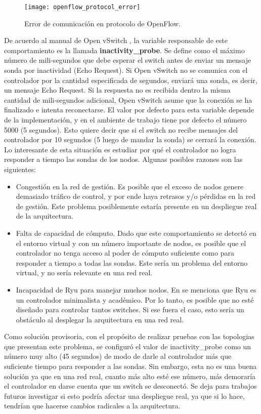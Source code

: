 \begin{figure}[t]
	\caption{Error de comunicación en protocolo de OpenFlow.}
	\texttt{[image: openflow\_protocol\_error]}
	\centering
	\label{fig:openflow_protocol_error}
\end{figure}
De acuerdo al manual de Open vSwitch \cite{ovs-vswitchd-conf}, la variable responsable de este comportamiento es la llamada \textbf{inactivity\_probe}. Se define como el máximo número de mili-segundos que debe esperar el switch antes de enviar un mensaje sonda por inactividad (Echo Request). Si Open vSwitch no se comunica con el controlador por la cantidad especificada de segundos, enviará una sonda, es decir, un mensaje Echo Request. Si la respuesta no es recibida dentro la misma cantidad de mili-segundos adicional, Open vSwitch asume que la conexión se ha finalizado e intenta reconectarse. El valor por defecto para esta variable depende de la implementación, y en el ambiente de trabajo tiene por defecto el número 5000 (5 segundos). Esto quiere decir que si el switch no recibe mensajes del controlador por 10 segundos (5 luego de mandar la sonda) se cerrará la conexión. \\
Lo interesante de esta situación es estudiar por qué el controlador no logra responder a tiempo las sondas de los nodos. Algunas posibles razones son las siguientes:
\begin{itemize}
	\item Congestión en la red de gestión. Es posible que el exceso de nodos genere demasiado tráfico de control, y por ende haya retrasos y/o pérdidas en la red de gestión. Este problema posiblemente estaría presente en un despliegue real de la arquitectura.
	\item Falta de capacidad de cómputo. Dado que este comportamiento se detectó en el entorno virtual y con un número importante de nodos, es posible que el controlador no tenga acceso al poder de cómputo suficiente como para responder a tiempo a todas las sondas. Este sería un problema del entorno virtual, y no sería relevante en una red real.
	\item Incapacidad de Ryu para manejar muchos nodos. En \cite{proyecto-rrap} se menciona que Ryu es un controlador minimalista y académico. Por lo tanto, es posible que no esté diseñado para controlar tantos switches. Si ese fuera el caso, esto sería un obstáculo al desplegar la arquitectura en una red real. 
\end{itemize}
Como solución provisoria, con el propósito de realizar pruebas con las topologias que presentan este problema, se configuró el valor de inactivity\_probe como un número muy alto (45 segundos) de modo de darle al controlador más que suficiente tiempo para responder a las sondas. Sin embargo, esta no es una buena solución ya que en una red real, cuanto más alto esté ese número, más demoraría el controlador en darse cuenta que un switch se desconectó. Se deja para trabajos futuros investigar si esto podría afectar una despliegue real, ya que si lo hace, tendrían que hacerse cambios radicales a la arquitectura.

